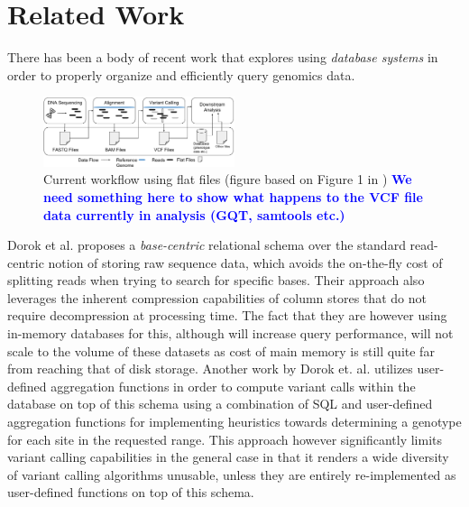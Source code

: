 \documentclass[conference,twocolumn,10pt]{IEEEtran}
\newcommand{\kostasnote}[1]{\textcolor{blue}{\bf #1}}
\begin{document}
\section{Related Work}
There has been a body of recent work that explores using \textit{database systems} in order to properly organize and efficiently query genomics data.

\begin{figure}[t]
    \centering
    \includegraphics[width=0.50\textwidth]{current-pipeline}
    \caption{Current workflow using flat files (figure based on Figure 1 in \cite{dorok2015relational})
    \kostasnote{We need something here to show what happens to the VCF file data currently in analysis (GQT, samtools etc.)}}
    \label{fig:current}
    \vspace{-10pt}
\end{figure}

Dorok et al. \cite{dorok2015relational,dorok2015plants} proposes a \textit{base-centric} relational schema over the standard read-centric notion of storing raw sequence data, which avoids the on-the-fly cost of splitting reads when trying to search for specific bases. Their approach also leverages the inherent compression capabilities of column stores that do not require decompression at processing time. The fact that they are however using in-memory databases for this, although will increase query performance, will not scale to the volume of these datasets as cost of main memory is still quite far from reaching that of disk storage. Another work by Dorok et. al. \cite{dorok2014variant} utilizes user-defined aggregation functions in order to compute variant calls within the database on top of this schema using a combination of SQL and user-defined aggregation functions for implementing heuristics towards determining a genotype for each site in the requested range. This approach however significantly limits variant calling capabilities in the general case in that it renders a wide diversity of variant calling algorithms unusable, unless they are entirely re-implemented as user-defined functions on top of this schema.
\end{document}
